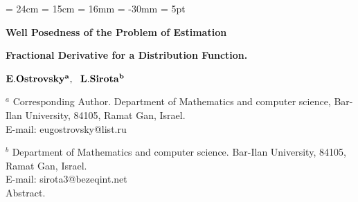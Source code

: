 	
\textheight = 24cm
\textwidth = 15cm
\oddsidemargin = 16mm
\voffset = -30mm
\topmargin =20mm
\sloppy
\emergencystretch = 5pt

\newcommand{\argmin}{\mathop{\rm argmin}\limits}

\newcommand{\const}{\mathop{\rm const}\limits}

\newcommand{\grad}{\mathop{\rm grad}\limits}

\newcommand{\mod}{\mathop{\rm mod}\limits}

\newcommand{\supp}{\mathop{\rm supp}\limits}

\newcommand{\Var}{\mathop{\rm Var}\limits}

\newcommand{\Law}{\mathop{\rm Law}\limits}

\newcommand{\Cov}{\mathop{\rm Cov}\limits}




\begin{center}

\vspace{3mm}

{\bf Well Posedness  of the Problem of Estimation }\par

\vspace{4mm}

{\bf Fractional Derivative for a  Distribution Function.} \\

\vspace{4mm}

 $ {\bf E.Ostrovsky^a, \ \ L.Sirota^b } $ \\

\vspace{4mm}

$ ^a $ Corresponding Author. Department of Mathematics and computer science, Bar-Ilan University, 84105, Ramat Gan, Israel.\\

E-mail: eugostrovsky@list.ru\\

\vspace{3mm}

$ ^b $  Department of Mathematics and computer science. Bar-Ilan University,
84105, Ramat Gan, Israel.\\

E-mail: sirota3@bezeqint.net \\

\vspace{4mm}
                    {\sc Abstract.}\\

 \end{center}

